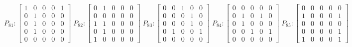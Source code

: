     $$
        P_{81} : \begin{bmatrix}
            1 & 0 & 0 & 0 & 1 \\
            0 & 1 & 0 & 0 & 0 \\
            0 & 1 & 0 & 0 & 0 \\
            0 & 1 & 0 & 0 & 0 \\
            0 & 0 & 0 & 0 & 0
        \end{bmatrix}
        \;
         P_{82} : \begin{bmatrix}
            0 & 1 & 0 & 0 & 0 \\
            0 & 0 & 0 & 0 & 0 \\
            1 & 1 & 0 & 0 & 0 \\
            0 & 1 & 0 & 0 & 0 \\
            1 & 0 & 0 & 0 & 0
        \end{bmatrix}
        \;
        P_{83} : \begin{bmatrix}
            0 & 0 & 1 & 0 & 0 \\
            0 & 0 & 0 & 1 & 0 \\
            0 & 0 & 0 & 1 & 0 \\
            0 & 1 & 0 & 0 & 1 \\
            0 & 0 & 0 & 0 & 0
        \end{bmatrix}
        \;
        P_{84} : \begin{bmatrix}
            0 & 0 & 0 & 0 & 0 \\
            0 & 1 & 0 & 1 & 0 \\
            0 & 1 & 0 & 0 & 0 \\
            0 & 0 & 1 & 0 & 1 \\
            0 & 0 & 0 & 0 & 0
        \end{bmatrix}
        \;
        P_{85} : \begin{bmatrix}
            0 & 0 & 0 & 0 & 0 \\
            1 & 0 & 0 & 0 & 1 \\
            0 & 0 & 0 & 0 & 0 \\
            0 & 0 & 0 & 0 & 1 \\
            1 & 0 & 0 & 0 & 1
        \end{bmatrix}
    $$

